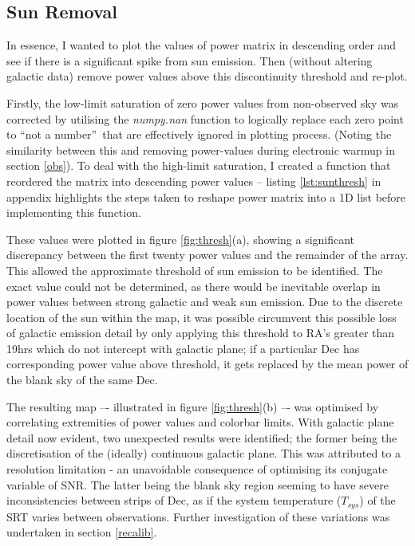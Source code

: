 \documentclass[a4paper]{jpconf}
\begin{document}
\begin{multicols}{2}
\subsection{Sun Removal}

In essence, I wanted to plot the values of power matrix in descending order and see if there is a significant spike from sun emission. Then (without altering galactic data) remove power values above this discontinuity threshold and re-plot.

Firstly, the low-limit saturation of zero power values from non-observed sky was corrected by utilising the \textit{numpy.nan} function to logically replace each zero point to \textquotedblleft not a number\textquotedblright~that are effectively ignored in plotting process. (Noting the similarity between this and removing power-values during electronic warmup in section \ref{obs}). To deal with the high-limit saturation, I created a function that reordered the matrix into descending power values -- listing \ref{lst:sunthresh} in appendix highlights the steps taken to reshape power matrix into a 1D list before implementing this function. 


These values were plotted in figure \ref{fig:thresh}(a), showing a significant discrepancy between the first twenty power values and the remainder of the array. This allowed the approximate threshold of sun emission to be identified. The exact value could not be determined, as there would be inevitable overlap in power values between strong galactic and weak sun emission. Due to the discrete location of the sun within the map, it was possible circumvent this possible loss of galactic emission detail by only applying this threshold to RA’s greater than 19hrs which do not intercept with galactic plane; if a particular Dec has corresponding power value above threshold, it gets replaced by the mean power of the blank sky of the same Dec.

The resulting map –- illustrated in figure \ref{fig:thresh}(b) –- was optimised by correlating extremities of power values and colorbar limits. With galactic plane detail now evident, two unexpected results were identified; the former being the discretisation of the (ideally) continuous galactic plane. This was attributed to a resolution limitation - an unavoidable consequence of optimising its conjugate variable of SNR. The latter being the blank sky region seeming to have severe inconsistencies between strips of Dec, as if the system temperature ($T_{sys}$) of the SRT varies between observations. Further investigation of these variations was undertaken in section \ref{recalib}.
 

\end{multicols}
\end{document}
